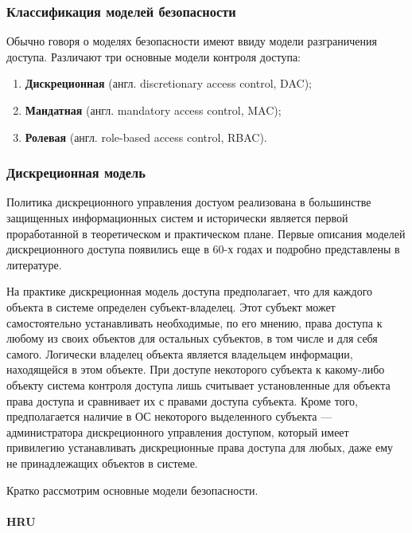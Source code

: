 \subsubsection{Классификация моделей безопасности}

Обычно говоря о моделях безопасности имеют ввиду модели разграничения доступа. Различают три основные модели контроля доступа:

\begin{enumerate}
    \item\textbf{Дискреционная} (англ. discretionary access control, DAC);
    \item\textbf{Мандатная} (англ. mandatory access control, MAC);
    \item\textbf{Ролевая} (англ. role-based access control, RBAC).
\end{enumerate}

\subsubsection{Дискреционная модель}

Политика дискреционного управления достуом реализована в большинстве защищенных информационных систем и исторически является первой проработанной в теоретическом и практическом плане. Первые описания моделей дискреционного доступа появились еще в 60-х годах и подробно представлены в литературе.

На практике дискреционная модель доступа предполагает, что для каждого объекта в системе определен субъект-владелец. Этот субъект может самостоятельно устанавливать необходимые, по его мнению, права доступа к любому из своих объектов для остальных субъектов, в том числе и для себя самого. Логически владелец объекта является владельцем информации, находящейся в этом объекте.  При доступе некоторого субъекта к какому-либо объекту система контроля доступа лишь считывает установленные для объекта права доступа и сравнивает их с правами доступа субъекта. Кроме того, предполагается наличие в ОС некоторого выделенного субъекта --- администратора дискреционного управления доступом, который имеет привилегию устанавливать дискреционные права доступа для любых, даже ему не принадлежащих объектов в системе.

Кратко рассмотрим основные модели безопасности.

\paragraph{HRU}

